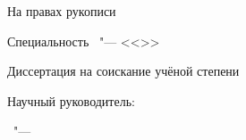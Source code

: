 

\thispagestyle{empty}
\begin{center}
	\thesisFirstOrganization
	
	\ifdefined\thesisSecondOrganization
		\thesisSecondOrganization
	\fi
\end{center}


\vspace{0pt plus4fill} 
\begin{flushright}
	На правах рукописи
\end{flushright}


\vspace{0pt plus6fill} 
\begin{center}
	{\large \thesisAuthor}
\end{center}


\vspace{0pt plus1fill} 
\begin{center}
	\textbf {\large \MakeUppercase \thesisTitle}
	
	\vspace{0pt plus2fill} 
	Специальность \thesisSpecialtyNumber\ "--- <<\thesisSpecialtyTitle>>
	
	\vspace{0pt plus2fill} 
	Диссертация на соискание учёной степени
	
	\thesisDegree
\end{center}


\vspace{0pt plus4fill} 
\begin{flushright}
	Научный руководитель:

	\supervisorRegalia

	\ifdefined\supervisorDead
		\framebox{\supervisorFio}
	\else
		\supervisorFio
	\fi
\end{flushright}


\vspace{0pt plus4fill} 
{\centering\thesisCity\ "--- \thesisYear\par}
